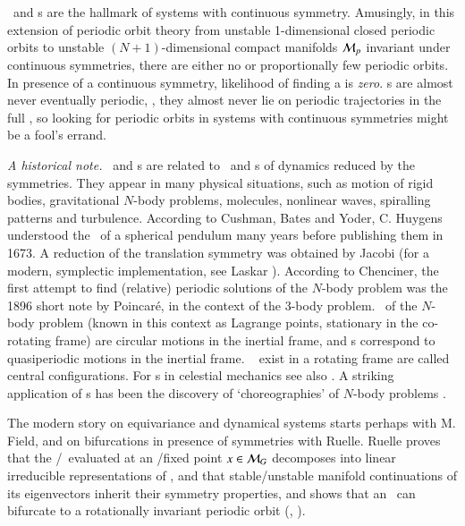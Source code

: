 \documentclass[preprint,number,sort&compress]{elsarticle}
\begin{document}
\Reqva\ and \rpo s are the hallmark of systems with
continuous symmetry. Amusingly, in this extension of
periodic orbit theory from unstable 1-dim\-ens\-ion\-al
closed periodic orbits to unstable
$(N\!+\!1)$-dim\-ens\-ion\-al compact manifolds ${\cal M}_p$
invariant under continuous symmetries, there are either no or
proportionally few periodic orbits. In presence of a
continuous  symmetry, likelihood of finding a {\po} is {\em
zero}. \Rpo s are almost never eventually periodic, \ie, they
almost never lie on periodic trajectories in the full
{\statesp}, so looking for periodic orbits in systems with 
continuous symmetries might be a fool's errand.

\emph{A historical note.}
\Reqva\ and \rpo s are
related to \eqva\ and \po s of dynamics
reduced by the symmetries. They appear in many physical
situations, such as motion of rigid bodies, gravitational
$N$-body problems, molecules, nonlinear waves, spiralling
patterns and turbulence. According to Cushman,
Bates and Yoder, C.
Huygens understood the \reqva\ of a spherical
pendulum many years before publishing them in 1673. A
reduction of the translation symmetry was obtained by Jacobi
(for a modern, symplectic implementation, see Laskar
\etal{}). According to Chenciner, the
first attempt to find (relative) periodic solutions of the
$N$-body problem was the 1896 short note by
Poincar\'e, in the context of the 3-body
problem. \Reqva\ of the $N$-body problem (known in this
context as Lagrange points, stationary in the co-rotating
frame) are circular motions in the inertial frame, and {\rpo
s} correspond to quasiperiodic motions in the inertial frame.
\Reqva\  exist in a rotating frame are called central
configurations. For \rpo s in celestial mechanics see also
. A striking application of \rpo s has been
the discovery of `choreographies' of $N$-body problems%
.

The modern story on equivariance and dynamical systems starts
perhaps with M. Field, and on bifurcations in
presence of symmetries  with Ruelle. Ruelle
proves that the \stabmat/\jacobianM\ evaluated at an
\eqv/fixed point $x \in {\cal M}_G$ decomposes into linear
irreducible representations of \Group, and that
stable/unstable manifold continuations of its eigenvectors
inherit their symmetry properties, and shows that an \eqv\
can bifurcate to a rotationally invariant periodic orbit
(\ie, \reqv).
\end{document}

